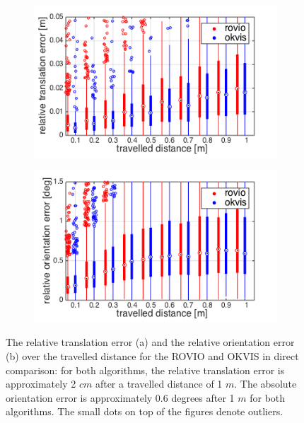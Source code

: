 \begin{figure}[h]
  \begin{subfigure}[b]{0.48\textwidth}
    \includegraphics[width=\textwidth]{images/ijrr/rte.png}
    \caption{}
    \label{fig:2}
  \end{subfigure}
  \hfill
  \begin{subfigure}[b]{0.48\textwidth}
    \includegraphics[width=\textwidth]{images/ijrr/roe.png}
    \caption{}
    \label{fig:2}
  \end{subfigure}
   \caption{The relative translation error (a) and the relative orientation error (b) over the travelled distance for the ROVIO and OKVIS in direct comparison: for both algorithms, the relative translation error is approximately 2 $cm$ after a travelled distance of 1 $m$. The absolute orientation error is approximately 0.6 degrees after 1 $m$ for both algorithms. The small dots on top of the figures denote outliers.}
   \label{pics:ijrr_rel}
\end{figure}

